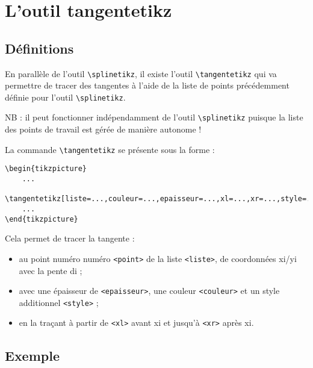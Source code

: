 \documentclass{article}
\begin{document}
\newpage

\section{L'outil \og tangentetikz \fg{}}

\subsection{Définitions}

En parallèle de l'outil \verb|\splinetikz|, il existe l'outil \verb|\tangentetikz| qui va permettre de tracer des tangentes à l'aide de la liste de points précédemment définie pour l'outil \verb|\splinetikz|.

\smallskip

NB : il peut fonctionner indépendamment de l'outil \verb|\splinetikz| puisque la liste des points de travail est gérée de manière autonome !

\medskip

La commande \verb|\tangentetikz| se présente sous la forme :

\begin{verbatim}
\begin{tikzpicture}
	...
	\tangentetikz[liste=...,couleur=...,epaisseur=...,xl=...,xr=...,style=...,point=...]
	...
\end{tikzpicture}
\end{verbatim}

Cela permet de tracer la tangente :
%
\begin{itemize}
	\item au point numéro numéro \texttt{<point>} de la liste \texttt{<liste>}, de coordonnées \textsf{xi/yi} avec la pente \textsf{di} ;
	\item avec une épaisseur de \texttt{<epaisseur>}, une couleur \texttt{<couleur>} et un style additionnel \texttt{<style>} ;
	\item en la traçant à partir de \texttt{<xl>} avant \textsf{xi} et jusqu'à \texttt{<xr>} après \textsf{xi}.
\end{itemize}

\subsection{Exemple}
\end{document}
